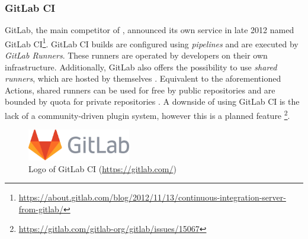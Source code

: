 
\subsubsection{GitLab CI}
GitLab, the main competitor of \github{}, announced its own \CI{} service in late 2012 named GitLab CI\footnote{\url{https://about.gitlab.com/blog/2012/11/13/continuous-integration-server-from-gitlab/}}. GitLab CI builds are configured using \emph{pipelines} and are executed by \emph{GitLab Runners}. These runners are operated by developers on their own infrastructure. Additionally, GitLab also offers the possibility to use \emph{shared runners}, which are hosted by themselves \cite{ciusinggitlab}. Equivalent to the aforementioned \github{} Actions, shared runners can be used for free by public repositories and are bounded by quota for private repositories \cite{gitlabdocs}. A downside of using GitLab CI is the lack of a community-driven plugin system, however this is a planned feature \footnote{\url{https://gitlab.com/gitlab-org/gitlab/issues/15067}}.

\begin{figure}[htbp!]
	\centering
	\includegraphics[width=0.40\textwidth]{assets/images/gitlab.pdf}
	\caption{Logo of GitLab CI (\url{https://gitlab.com/})}
	\label{fig:gitlab-ci}
\end{figure}